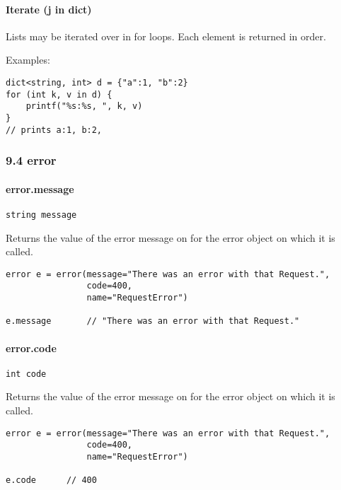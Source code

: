 \paragraph{Iterate (j in dict)}\label{iterate-j-in-dict}

Lists may be iterated over in for loops. Each element is returned in
order.

Examples:

\begin{verbatim}
dict<string, int> d = {"a":1, "b":2}
for (int k, v in d) {
    printf("%s:%s, ", k, v)
}
// prints a:1, b:2,
\end{verbatim}

\subsubsection{9.4 error}\label{error}

\paragraph{error.message}\label{error.message}

\begin{verbatim}
string message
\end{verbatim}

Returns the value of the error message on for the error object on which
it is called.

\begin{verbatim}
error e = error(message="There was an error with that Request.",
                code=400,
                name="RequestError")

e.message       // "There was an error with that Request."
\end{verbatim}

\paragraph{error.code}\label{error.code}

\begin{verbatim}
int code
\end{verbatim}

Returns the value of the error message on for the error object on which
it is called.

\begin{verbatim}
error e = error(message="There was an error with that Request.",
                code=400,
                name="RequestError")

e.code      // 400
\end{verbatim}

